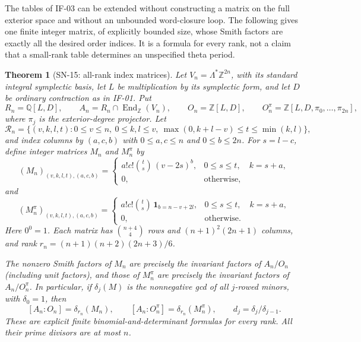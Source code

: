 \documentclass[11pt,a4paper]{article}
\newtheorem{theorem}{Theorem}[section]
\theoremstyle{definition}
\theoremstyle{remark}
\begin{document}
The tables of IF-03 can be extended without constructing a matrix on
the full exterior space and without an unbounded word-closure loop.
The following gives one finite integer matrix, of explicitly bounded
size, whose Smith factors are exactly all the desired order indices.
It is a formula for every rank, not a claim that a small-rank table
determines an unspecified theta period.

\begin{theorem}[SN-15: all-rank index matrices]
Let $V_n=\Lambda^*\mathbb Z^{2n}$, with its standard integral
symplectic basis, let $L$ be multiplication by its symplectic form,
and let $D$ be ordinary contraction as in IF-01. Put
\[
 R_n=\mathbb Q[L,D],\qquad
 A_n=R_n\cap\operatorname{End}_{\mathbb Z}(V_n),\qquad
 O_n=\mathbb Z[L,D],\qquad
 O_n^\pi=\mathbb Z[L,D,\pi_0,\ldots,\pi_{2n}],
\]
where $\pi_j$ is the exterior-degree projector. Let
\[
 \mathcal R_n=\{(v,k,l,t):0\le v\le n,\ 0\le k,l\le v,
 \ \max(0,k+l-v)\le t\le\min(k,l)\},
\]
and index columns by $(a,c,b)$ with $0\le a,c\le n$ and
$0\le b\le2n$. For $s=l-c$, define integer matrices $M_n$ and
$M_n^\pi$ by
\[
 (M_n)_{(v,k,l,t),(a,c,b)}=
 \begin{cases}
 a!c!\binom ts\,(v-2s)^b,&0\le s\le t,\quad k=s+a,\\
 0,&\text{otherwise},
 \end{cases}                                      \tag{SN-15a}
\]
and
\[
 (M_n^\pi)_{(v,k,l,t),(a,c,b)}=
 \begin{cases}
 a!c!\binom ts\,\mathbf1_{b=n-v+2l},
       &0\le s\le t,\quad k=s+a,\\
 0,&\text{otherwise}.
 \end{cases}                                      \tag{SN-15b}
\]
Here $0^0=1$. Each matrix has $\binom{n+4}{4}$ rows and
$(n+1)^2(2n+1)$ columns, and rank
$r_n=(n+1)(n+2)(2n+3)/6$.

The nonzero Smith factors of $M_n$ are precisely the invariant
factors of $A_n/O_n$ (including unit factors), and those of
$M_n^\pi$ are precisely the invariant factors of $A_n/O_n^\pi$.
In particular, if $\delta_j(M)$ is the nonnegative gcd of all
$j$-rowed minors, with $\delta_0=1$, then
\[
 [A_n:O_n]=\delta_{r_n}(M_n),\qquad
 [A_n:O_n^\pi]=\delta_{r_n}(M_n^\pi),\qquad
 d_j=\delta_j/\delta_{j-1}.                         \tag{SN-15c}
\]
These are explicit finite binomial-and-determinant formulas for
every rank. All their prime divisors are at most $n$.
\end{theorem}
\end{document}
